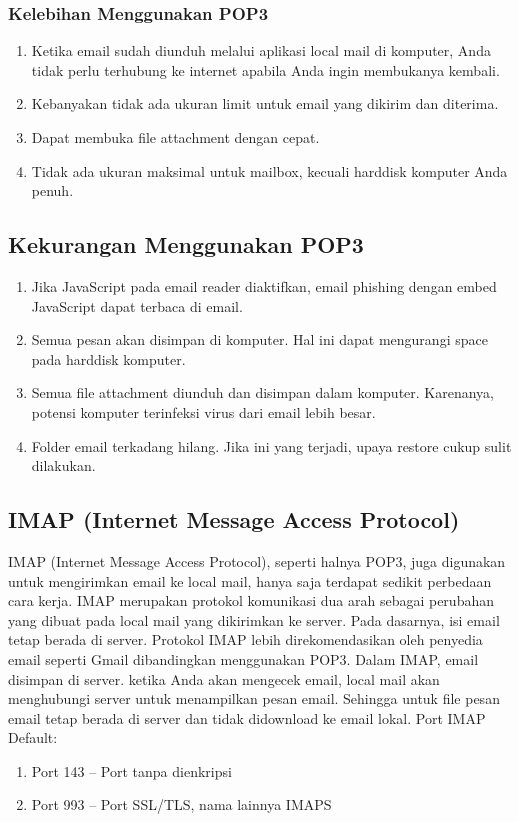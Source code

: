 \subsubsection {Kelebihan Menggunakan POP3}
	\begin{enumerate}
		\item Ketika email sudah diunduh melalui aplikasi local mail di komputer, Anda tidak perlu terhubung ke internet apabila Anda ingin membukanya kembali. 
		\item Kebanyakan tidak ada ukuran limit untuk email yang dikirim dan diterima. 
		\item Dapat membuka ﬁle attachment dengan cepat.
		\item Tidak ada ukuran maksimal untuk mailbox, kecuali harddisk komputer Anda penuh.
	\end{enumerate}
	
\subsection {Kekurangan Menggunakan POP3} 
	\begin{enumerate}
		\item Jika JavaScript pada email reader diaktifkan, email phishing dengan embed JavaScript dapat terbaca di email. 
		\item Semua pesan akan disimpan di komputer. Hal ini dapat mengurangi space pada harddisk komputer.
		\item Semua file attachment diunduh dan disimpan dalam komputer. Karenanya, potensi komputer terinfeksi virus dari email lebih besar. \item Folder email terkadang hilang. Jika ini yang terjadi, upaya restore cukup sulit dilakukan.
	\end{enumerate}

\subsection {IMAP (Internet Message Access Protocol)}
	IMAP (Internet Message Access Protocol), seperti halnya POP3, juga digunakan untuk mengirimkan email ke local mail, hanya saja terdapat sedikit perbedaan cara kerja.
	IMAP merupakan protokol komunikasi dua arah sebagai perubahan yang dibuat pada local mail yang dikirimkan ke server. Pada dasarnya, isi email tetap berada di server. Protokol IMAP lebih direkomendasikan oleh penyedia email seperti Gmail dibandingkan menggunakan POP3.
	Dalam IMAP, email disimpan di server. ketika Anda akan mengecek email, local mail akan menghubungi server untuk menampilkan pesan email. Sehingga untuk file pesan email tetap berada di server dan tidak didownload ke email lokal. Port IMAP Default: 
	\begin{enumerate}
		\item Port 143 – Port tanpa dienkripsi 
		\item Port 993 – Port SSL/TLS, nama lainnya IMAPS
	\end{enumerate}

